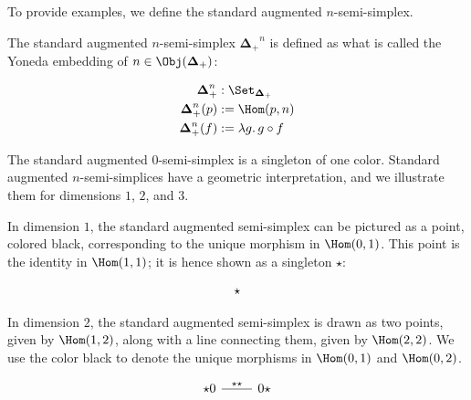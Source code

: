 \documentclass[10pt]{art.cls/art}
\newcommand{\DeltaPlus}{\ensuremath{\boldsymbol{\Delta}_+}}
\newcommand{\kstar}{{\star}}
\begin{document}
To provide examples, we define the standard augmented $n$-semi-simplex.

\begin{definition}[$\DeltaPlus^n$]
  The standard augmented $n$-semi-simplex $\DeltaPlus^n$ is defined as what is called the Yoneda embedding of $n \in \Obj(\DeltaPlus)$:

  \begin{align*}
    \DeltaPlus^n    & : \Set_{\DeltaPlus}        \\
    \DeltaPlus^n(p) & := \Hom(p, n)              \\
    \DeltaPlus^n(f) & := \lambda g .\, g \circ f
  \end{align*}
\end{definition}

The standard augmented $0$-semi-simplex is a singleton of one color. Standard augmented $n$-semi-simplices have a geometric interpretation, and we illustrate them for dimensions $1$, $2$, and $3$.

\begin{example}[$\DeltaPlus^1$]
  In dimension $1$, the standard augmented semi-simplex can be pictured as a point, colored black, corresponding to the unique morphism in $\Hom(0, 1)$. This point is the identity in $\Hom(1, 1)$; it is hence shown as a singleton $\kstar$:

  \begin{equation*}
    \begin{tikzcd}
      \kstar
    \end{tikzcd}
  \end{equation*}
\end{example}

\begin{example}[$\DeltaPlus^2$]
  In dimension $2$, the standard augmented semi-simplex is drawn as two points, given by $\Hom(1, 2)$, along with a line connecting them, given by $\Hom(2, 2)$. We use the color black to denote the unique morphisms in $\Hom(0, 1)$ and $\Hom(0, 2)$.

  \begin{equation*}
    \begin{tikzcd}
      \kstar0 \arrow[r, dash, "\kstar\kstar"] & 0\kstar
    \end{tikzcd}
  \end{equation*}
\end{example}
\end{document}
